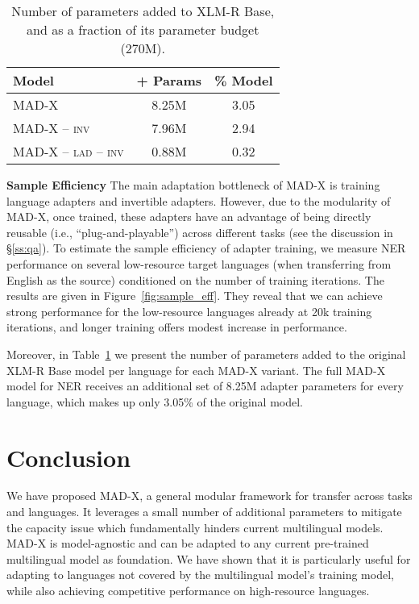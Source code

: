 \documentclass[11pt,a4paper]{article}
\newcommand{\model}[1]{\textsc{MAD-X}}
\begin{document}
\begin{table}[]
\centering
\def\arraystretch{0.99}
{\footnotesize
\resizebox{\columnwidth}{!}
{\begin{tabular}{l cc}
\toprule
Model	&	+ Params	&	\% Model	  \\
\midrule
\model{}	 &	 8.25M	&  3.05  	\\
\model{}  -- \textsc{inv}	& 7.96M	& 2.94	\\
\model{}  -- \textsc{lad} -- \textsc{inv}	&	0.88M 	&	0.32 	\\
\bottomrule
\end{tabular}}
} 
\caption{Number of parameters added to  
XLM-R Base, 
and as a fraction of its parameter budget (270M).}
\label{tab:parameters} 
\end{table}

\vspace{1.8mm}
\noindent \textbf{Sample Efficiency}\hspace{0.3mm}
The main adaptation bottleneck of \model{} is training language adapters and invertible adapters. However, due to the modularity of \model{}, once trained, these adapters have an advantage of being directly reusable (i.e., ``plug-and-playable'') across different tasks (see the discussion in \S\ref{ss:qa}). To estimate the sample efficiency of adapter training, we measure NER performance on several low-resource target languages (when transferring from English as the source) conditioned on the number of training iterations. The results are given in Figure~\ref{fig:sample_eff}. They reveal that we can achieve strong performance for the low-resource languages already at 20k training iterations, and longer training offers modest increase in performance.

 
Moreover, in Table~\ref{tab:parameters} we present the number of parameters added to the original XLM-R Base model per language for each \model{} variant. The full \model{} model for NER receives an additional set of 8.25M adapter parameters for every language, which makes up only 3.05\% of the original model.

 
\section{Conclusion}

We have proposed \model{}, a general modular framework for transfer across tasks and languages. It leverages a small number of additional parameters to mitigate the capacity issue which fundamentally hinders current multilingual models. \model{} is model-agnostic and can be adapted to any current pre-trained multilingual model as foundation. We have shown that it is particularly useful for adapting to languages not covered by the multilingual model's training model, while also achieving competitive performance on high-resource languages. 
\end{document}
